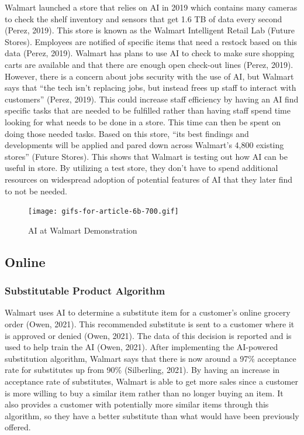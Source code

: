 \documentclass[
]{article}
\begin{document}
Walmart launched a store that relies on AI in 2019 which contains many cameras to check the shelf inventory and sensors that get 1.6 TB of data every second (Perez, 2019). This store is known as the Walmart Intelligent Retail Lab (Future Stores). Employees are notified of specific items that need a restock based on this data (Perez, 2019). Walmart has plans to use AI to check to make sure shopping carts are available and that there are enough open check-out lines (Perez, 2019). However, there is a concern about jobs security with the use of AI, but Walmart says that ``the tech isn't replacing jobs, but instead frees up staff to interact with customers'' (Perez, 2019). This could increase staff efficiency by having an AI find specific tasks that are needed to be fulfilled rather than having staff spend time looking for what needs to be done in a store. This time can then be spent on doing those needed tasks. Based on this store, ``its best findings and developments will be applied and pared down across Walmart's 4,800 existing stores'' (Future Stores). This shows that Walmart is testing out how AI can be useful in store. By utilizing a test store, they don't have to spend additional resources on widespread adoption of potential features of AI that they later find to not be needed.

\begin{figure}
\centering
\texttt{[image: gifs-for-article-6b-700.gif]}
\caption{AI at Walmart Demonstration}
\end{figure}

\hypertarget{online}{%
\subsection{Online}\label{online}}

\hypertarget{substitutable-product-algorithm}{%
\subsubsection{Substitutable Product Algorithm}\label{substitutable-product-algorithm}}

Walmart uses AI to determine a substitute item for a customer's online grocery order (Owen, 2021). This recommended substitute is sent to a customer where it is approved or denied (Owen, 2021). The data of this decision is reported and is used to help train the AI (Owen, 2021). After implementing the AI-powered substitution algorithm, Walmart says that there is now around a 97\% acceptance rate for substitutes up from 90\% (Silberling, 2021). By having an increase in acceptance rate of substitutes, Walmart is able to get more sales since a customer is more willing to buy a similar item rather than no longer buying an item. It also provides a customer with potentially more similar items through this algorithm, so they have a better substitute than what would have been previously offered.
\end{document}

